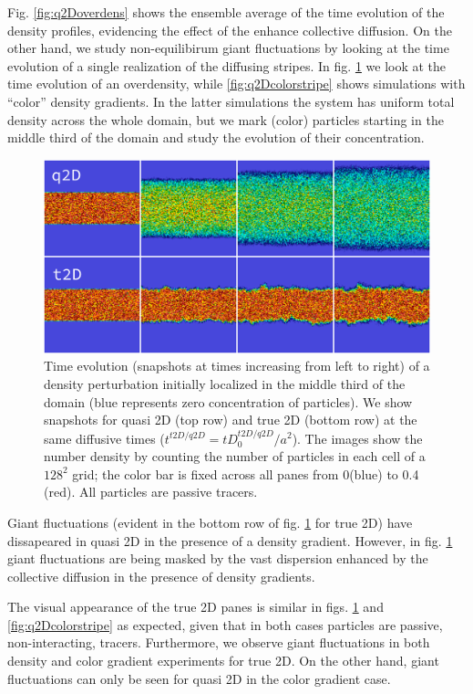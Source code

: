 \documentclass[ twoside,openright,titlepage,numbers=noenddot,%
headinclude,footinclude,cleardoublepage=empty,abstract=on,
BCOR=5mm,paper=a4,fontsize=11pt, dvipsnames
]{scrreprt}
\begin{document}
Fig. \ref{fig:q2Doverdens} shows the ensemble average of the time evolution of the density profiles, evidencing the effect of the enhance collective diffusion.
On the other hand, we study non-equilibirum giant fluctuations by looking at the time evolution of a single realization of the diffusing stripes. In fig. \ref{fig:q2Dstripes} we look at the time evolution of an overdensity, while \ref{fig:q2Dcolorstripe} shows simulations with ``color'' density gradients. In the latter simulations the system has uniform total density across the whole domain, but we mark (color) particles starting in the middle third of the domain and study the evolution of their concentration.
\begin{figure}[H]
  \label{fig:q2Dstripes}
  \centering
  \includegraphics[width=\linewidth]{gfx/q2Dstripes}
  \caption{Time evolution (snapshots at times increasing from left to right) of a density perturbation initially localized in the middle third of the domain (blue represents zero concentration of particles). We show snapshots for quasi 2D (top row) and true 2D (bottom row) at the same diffusive times ($t^{t2D/q2D}= tD_0^{t2D/q2D}/a^2$). The images show the number density by counting the number of particles in each cell of a $128^2$ grid; the color bar is fixed across all panes from 0(blue) to 0.4 (red). All particles are passive tracers.}
\end{figure}
Giant fluctuations (evident in the bottom row of fig. \ref{fig:q2Dstripes} for true 2D) have dissapeared in quasi 2D in the presence of a density gradient. However, in fig. \ref{fig:q2Dstripes} giant fluctuations are being masked by the vast dispersion enhanced by the collective diffusion in the presence of density gradients.

The visual appearance of the true 2D panes is similar in figs. \ref{fig:q2Dstripes} and \ref{fig:q2Dcolorstripe} as expected, given that in both cases particles are passive, non-interacting, tracers. Furthermore, we observe giant fluctuations in both density and color gradient experiments for true 2D. On the other hand, giant fluctuations can only be seen for quasi 2D in the color gradient case.
\end{document}
